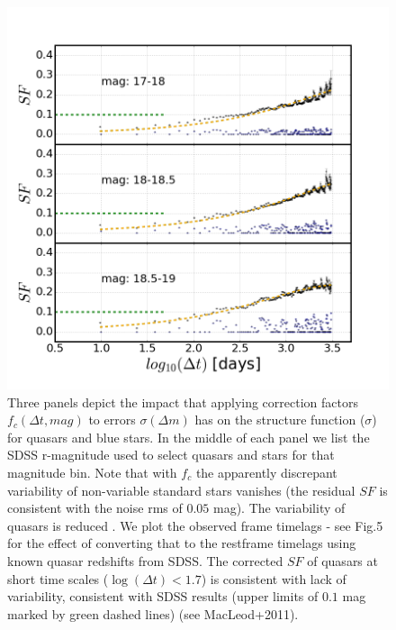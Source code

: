 \documentclass[fleqn,usenatbib]{mnras}  %
\begin{document}
\begin{figure}
\end{figure}



\begin{figure}
\label{fig:4}
 \includegraphics[width=\columnwidth]{Fig_4_SF_QSO_starsB_r_cut.png}
 \caption{Three panels depict the impact that applying correction factors $f_{c}(\Delta t, mag)$ to errors $\sigma(\Delta m)$ has on the structure function ($\sigma$) for quasars and blue stars. In the middle of each panel we list the SDSS r-magnitude used to select quasars and stars for that magnitude bin. Note that with $f_{c}$ the apparently discrepant variability of non-variable standard stars  vanishes (the residual $SF$ is consistent with the noise rms of $0.05$ mag). The variability of quasars is reduced . We plot the observed frame timelags - see Fig.5 for the effect of converting that to the restframe timelags using known quasar redshifts from SDSS. The corrected $SF$ of quasars at short time scales ($\log(\Delta t) < 1.7$) is consistent with lack of variability, consistent with SDSS results (upper limits of $0.1$ mag marked by green dashed lines) (see MacLeod+2011).}
\end{figure}
\end{document}
